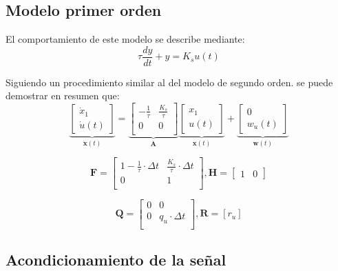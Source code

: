 \documentclass[conference]{IEEEtran}
\begin{document}
\subsection{Modelo primer orden}

El comportamiento de este modelo se describe mediante:
\[
\tau \frac{dy}{dt} + y = K_s u(t)
\]

Siguiendo un procedimiento similar al del modelo de segundo orden. se puede demostrar en resumen que:
\begin{equation*}
	\underbrace{
		\begin{bmatrix}
			\dot{x}_1 \\
			\dot{u}(t)
		\end{bmatrix}
	}_{\mathbf{\dot{x}}(t)}
	=
	\underbrace{\begin{bmatrix}
			-\frac{1}{\tau}           & \frac{K_s}{\tau}                 \\
			0 & 0   \\
	\end{bmatrix}}_{\mathbf{A}}
	\underbrace{\begin{bmatrix}
			x_1 \\
			u(t) 
	\end{bmatrix}}_{\mathbf{x}(t)}	
	+
	\underbrace{
		\begin{bmatrix}
			0 \\
			w_{u}(t)
		\end{bmatrix}
	}_{\mathbf{w}(t)}
\end{equation*}

\[
	\mathbf{F} = \begin{bmatrix}
		1 -\frac{1}{\tau} \cdot \Delta t          & \frac{K_s}{\tau} \cdot \Delta t               \\
		0 & 1 \\
	\end{bmatrix},
	\mathbf{H} =
	\begin{bmatrix}
		1 & 0
	\end{bmatrix}
\]

\[
\mathbf{Q} = \begin{bmatrix}
	0 & 0  \\
	0 & q_u \cdot \Delta t \\
\end{bmatrix}, 
\mathbf{R} = [r_u]
\]


\subsection{Acondicionamiento de la señal}
\end{document}
